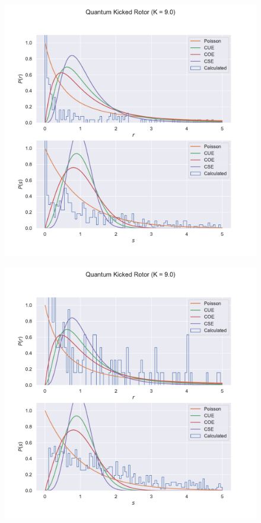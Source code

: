\documentclass[12pt]{article}
\begin{document}
\begin{figure}
    \centering
    \includegraphics[width=\linewidth]{kickedrotor_spectrum_K9.0_magnified.pdf}
\end{figure}
\begin{figure}
    \centering
    \includegraphics[width=\linewidth]{kickedrotor_spectrum_K9.0_magnified_suppressed.pdf}
\end{figure}
\nocite{*}
\printbibliography
\end{document}
